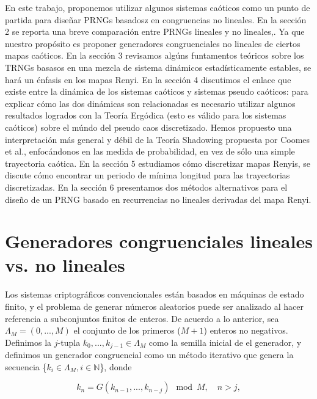 En este trabajo, proponemos utilizar algunos sistemas caóticos como un punto de partida para diseñar PRNGs basadosz en congruencias no lineales. En la sección 2 se reporta una breve comparación entre PRNGs lineales y no lineales,. Ya que nuestro propósito es proponer generadores congruenciales no lineales de ciertos mapas caóticos. En la sección 3 revisamos algúns funtamentos teóricos sobre los TRNGs basasos en una mezcla de sistema dinámicos estadísticamente estables, se hará un énfasis en los mapas Renyi. En la sección 4 discutimos el enlace que existe entre la dinámica de los sistemas caóticos y sistemas pseudo caóticos: para explicar cómo las dos dinámicas son relacionadas es necesario utilizar algunos resultados logrados con la Teoría Ergódica (esto es válido para los sistemas caóticos) sobre el múndo del pseudo caos discretizado. Hemos propuesto una interpretación más general y débil de la Teoría Shadowing propuesta por Coomes et al., enfocándonos en las medida de probabilidad, en vez de sólo una simple trayectoria caótica. En la sección 5 estudiamos cómo discretizar mapas Renyis, se discute cómo encontrar un periodo de mínima longitud para las trayectorias discretizadas. En la sección 6 presentamos dos métodos alternativos para el diseño de un PRNG basado en recurrencias no lineales derivadas del mapa Renyi.

\section{Generadores congruenciales lineales vs. no lineales}

Los sistemas criptográficos convencionales están basados en máquinas de estado finito, y el problema de generar números aleatorios puede ser analizado al hacer referencia a subconjuntos finitos de enteros. De acuerdo a lo anterior, sea $\Lambda_{M}= (0, ... , M)$ el conjunto de los primeros ($M+1$) enteros no negativos. Definimos la $j$-tupla $k_{0}, ... , k_{j-1} \in \Lambda_{M} $ como la semilla inicial de el generador, y definimos un generador congruencial como un método iterativo que genera la secuencia \{$k_{i} \in \Lambda_{M}, i \in \mathbb{N} $\}, donde 

\begin{equation}\label{gcl}
k_{n}= G(k_{n-1}, ... , k_{n-j}) \mod{M}, \quad n >j,
\end{equation}


